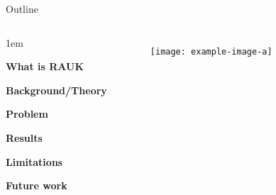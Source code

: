 \begin{frame}{Outline}
    \begin{columns}
        \begin{itemize-size}{1em} 
            \item \textbf{What is RAUK}
            \item \textbf{Background/Theory}
            \item \textbf{Problem}
            \item \textbf{Results}
            \item \textbf{Limitations}
            \item \textbf{Future work}
        \end{itemize-size}
        
        \begin{figure}
            \centering
            \texttt{[image: example-image-a]}
            \label{fig:handshake_agenda}
        \end{figure}
    \end{columns}
\end{frame}

